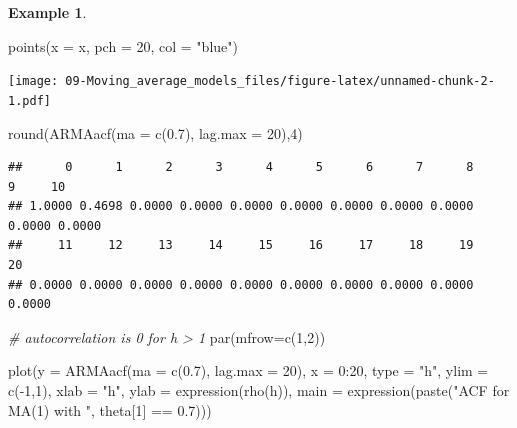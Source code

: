 \documentclass[
]{book}
\newenvironment{Shaded}{\begin{snugshade}}{\end{snugshade}}
\newcommand{\AttributeTok}[1]{\textcolor[rgb]{0.77,0.63,0.00}{#1}}
\newcommand{\CommentTok}[1]{\textcolor[rgb]{0.56,0.35,0.01}{\textit{#1}}}
\newcommand{\DecValTok}[1]{\textcolor[rgb]{0.00,0.00,0.81}{#1}}
\newcommand{\FloatTok}[1]{\textcolor[rgb]{0.00,0.00,0.81}{#1}}
\newcommand{\FunctionTok}[1]{\textcolor[rgb]{0.00,0.00,0.00}{#1}}
\newcommand{\NormalTok}[1]{#1}
\newcommand{\SpecialCharTok}[1]{\textcolor[rgb]{0.00,0.00,0.00}{#1}}
\newcommand{\StringTok}[1]{\textcolor[rgb]{0.31,0.60,0.02}{#1}}
\theoremstyle{definition}
\theoremstyle{definition}
\newtheorem{example}{Example}[chapter]
\theoremstyle{definition}
\theoremstyle{definition}
\theoremstyle{remark}
\begin{document}
\begin{example}
\begin{Shaded}
\begin{Highlighting}[]
\FunctionTok{points}\NormalTok{(}\AttributeTok{x =}\NormalTok{ x, }\AttributeTok{pch =} \DecValTok{20}\NormalTok{, }\AttributeTok{col =} \StringTok{"blue"}\NormalTok{)}
\end{Highlighting}
\end{Shaded}

\texttt{[image: 09-Moving\_average\_models\_files/figure-latex/unnamed-chunk-2-1.pdf]}

\begin{Shaded}
\begin{Highlighting}[]
\FunctionTok{round}\NormalTok{(}\FunctionTok{ARMAacf}\NormalTok{(}\AttributeTok{ma =} \FunctionTok{c}\NormalTok{(}\FloatTok{0.7}\NormalTok{), }\AttributeTok{lag.max =} \DecValTok{20}\NormalTok{),}\DecValTok{4}\NormalTok{)}
\end{Highlighting}
\end{Shaded}

\begin{verbatim}
##      0      1      2      3      4      5      6      7      8      9     10 
## 1.0000 0.4698 0.0000 0.0000 0.0000 0.0000 0.0000 0.0000 0.0000 0.0000 0.0000 
##     11     12     13     14     15     16     17     18     19     20 
## 0.0000 0.0000 0.0000 0.0000 0.0000 0.0000 0.0000 0.0000 0.0000 0.0000
\end{verbatim}

\begin{Shaded}
\begin{Highlighting}[]
\CommentTok{\# autocorrelation is 0 for h \textgreater{} 1}
\FunctionTok{par}\NormalTok{(}\AttributeTok{mfrow=}\FunctionTok{c}\NormalTok{(}\DecValTok{1}\NormalTok{,}\DecValTok{2}\NormalTok{))}

\FunctionTok{plot}\NormalTok{(}\AttributeTok{y =} \FunctionTok{ARMAacf}\NormalTok{(}\AttributeTok{ma =} \FunctionTok{c}\NormalTok{(}\FloatTok{0.7}\NormalTok{), }\AttributeTok{lag.max =} \DecValTok{20}\NormalTok{), }\AttributeTok{x =} \DecValTok{0}\SpecialCharTok{:}\DecValTok{20}\NormalTok{,}
     \AttributeTok{type =} \StringTok{"h"}\NormalTok{, }\AttributeTok{ylim =} \FunctionTok{c}\NormalTok{(}\SpecialCharTok{{-}}\DecValTok{1}\NormalTok{,}\DecValTok{1}\NormalTok{), }\AttributeTok{xlab =} \StringTok{"h"}\NormalTok{, }\AttributeTok{ylab =} 
     \FunctionTok{expression}\NormalTok{(}\FunctionTok{rho}\NormalTok{(h)), }\AttributeTok{main =} \FunctionTok{expression}\NormalTok{(}\FunctionTok{paste}\NormalTok{(}\StringTok{"ACF for }
\StringTok{     MA(1) with "}\NormalTok{, theta[}\DecValTok{1}\NormalTok{] }\SpecialCharTok{==} \FloatTok{0.7}\NormalTok{)))}
\end{Highlighting}
\end{Shaded}


\end{example}
\end{document}
